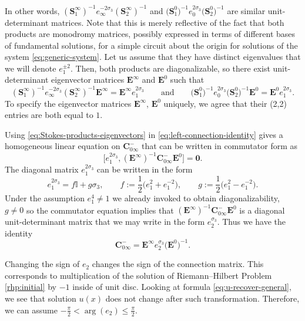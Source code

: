  In other words, $ (\mathbf{S}^\infty_{1})^{-1}e_\infty^{-2\sigma_3}(\mathbf{S}_{2}^\infty )^{-1}$ and $\big(\mathbf{S}^0_{1}\big)^{-1}e_0^{2\sigma_3}\big(\mathbf{S}_{2}^0 \big)^{-1}$ are similar unit-determinant matrices. Note that this is merely reflective of the fact that both products are monodromy matrices, possibly expressed in terms of different bases of fundamental solutions, for a simple circuit about the origin for solutions of the system \eqref{eq:generic-system}. Let us assume that they have distinct eigenvalues that we will denote $e_1^{\pm 2}$. Then, both products are diagonalizable, so there exist unit-determinant eigenvector matrices $\mathbf{E}^\infty$ and $\mathbf{E}^0$ such that
 \begin{equation}
 (\mathbf{S}^\infty_{1})^{-1}e_\infty^{-2\sigma_3}(\mathbf{S}_{2}^\infty )^{-1}\mathbf{E}^\infty=\mathbf{E}^\infty e_1^{2\sigma_3}\qquad\text{and}\qquad
 \big(\mathbf{S}^0_{1}\big)^{-1}e_0^{2\sigma_3}\big(\mathbf{S}_{2}^0 \big)^{-1}\mathbf{E}^0=\mathbf{E}^0 e_1^{2\sigma_3}.
 \label{eq:Stokes-products-eigenvectors}
 \end{equation}
To specify the eigenvector matrices $\mathbf{E}^\infty$, $\mathbf{E}^0$ uniquely, we agree that their (2,2) entries are both equal to $1$.


 Using \eqref{eq:Stokes-products-eigenvectors} in \eqref{eq:left-connection-identity} gives a homogeneous linear equation on $\mathbf{C}_{0\infty}^-$ that can be written in commutator form as
 \begin{equation*}
 \big[e_1^{2\sigma_3},(\mathbf{E}^\infty)^{-1}\mathbf{C}_{0\infty}^-\mathbf{E}^0\big]=\mathbf{0}.
 \end{equation*}
 The diagonal matrix $e_1^{2\sigma_3}$ can be written in the form
 \begin{equation*}
 e_1^{2\sigma_3}=f\mathbb{I}+g\sigma_3,\qquad f:= \frac{1}{2}\big(e_1^2+e_1^{-2}\big),\qquad g:=\frac{1}{2}\big(e_1^2-e_1^{-2}\big).
 \end{equation*}
 Under the assumption $e_1^4\neq 1$ we already invoked to obtain diagonalizability, $g\neq 0$ so the commutator equation implies that $(\mathbf{E}^\infty)^{-1}\mathbf{C}_{0\infty}^-\mathbf{E}^0$ is a diagonal unit-determinant matrix that we may write in the form $e_2^{\sigma_3}$. Thus we have the identity
 \begin{equation}
 \label{eq:C-zero-infty-diagonalization}
 \mathbf{C}_{0\infty}^-=\mathbf{E}^\infty e_2^{\sigma_3}\big(\mathbf{E}^0\big)^{-1}.
 \end{equation}
 \begin{Remark}\label{remark:change-sign-e2}
 Changing the sign of $e_2$ changes the sign of the connection matrix. This corresponds to multiplication of the solution of Riemann--Hilbert Problem \ref{rhp:initial} by $-1$ inside of unit disc. Looking at formula \eqref{eq:u-recover-general}, we see that solution $u(x)$ does not change after such transformation. Therefore, we can assume $-\frac{\pi}{2}<\arg(e_2)\leq\frac{\pi}{2}$.
 \end{Remark}

